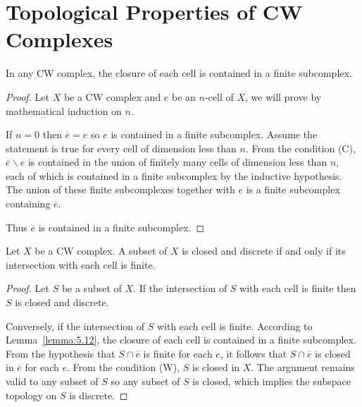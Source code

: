 \section*{Topological Properties of CW Complexes}

\begin{lemma}{5.12}\label{lemma:5.12}
	In any CW complex, the closure of each cell is contained in a finite subcomplex.
\end{lemma}

\begin{proof}
	Let \( X \) be a CW complex and \( e \) be an \( n \)-cell of \( X \), we will prove by mathematical induction on \( n \).

	If \( n = 0 \) then \( \overline{e} = e \) so \( e \) is contained in a finite subcomplex. Assume the statement is true for every cell of dimension less than \( n \). From the condition (C), \( \overline{e} \smallsetminus e \) is contained in the union of finitely many cells of dimension less than \( n \), each of which is contained in a finite subcomplex by the inductive hypothesis. The union of these finite subcomplexes together with \( e \) is a finite subcomplex containing \( \overline{e} \).

	Thus \( \overline{e} \) is contained in a finite subcomplex.
\end{proof}

\begin{lemma}{5.13}\label{lemma:5.13}
	Let \( X \) be a CW complex. A subset of \( X \) is closed and discrete if and only if its intersection with each cell is finite.
\end{lemma}

\begin{proof}
	Let \( S \) be a subset of \( X \). If the intersection of \( S \) with each cell is finite then \( S \) is closed and discrete.

	Conversely, if the intersection of \( S \) with each cell is finite. According to Lemma~\ref{lemma:5.12}, the closure of each cell is contained in a finite subcomplex. From the hypothesis that \( S \cap \overline{e} \) is finite for each \( e \), it follows that \( S \cap \overline{e} \) is closed in \( \overline{e} \) for each \( e \). From the condition (W), \( S \) is closed in \( X \). The argument remains valid to any subset of \( S \) so any subset of \( S \) is closed, which implies the subspace topology on \( S \) is discrete.
\end{proof}

